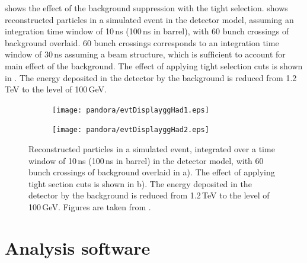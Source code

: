 
 shows the effect of the background suppression   with the tight \PFO selection.   shows reconstructed particles  in a simulated \HepProcess{\Pep\Pem \to \PHiggs\PHiggs \to \Ptop\APbottom\Pbottom\APtop} event  in the \CLICILD detector model, assuming an integration  time window of 10\,ns (100\,ns in \HCAL barrel), with 60 bunch crossings of \ggHad background overlaid. 60 bunch crossings corresponds to an integration time window of 30\,ns assuming a \CLIC beam structure, which is sufficient to account for main effect of the background.  The effect of applying tight \PFO selection cuts is shown in . The energy deposited in the detector by the background is reduced from 1.2\,TeV to the level of 100\,GeV.


\begin{figure}[tbph]
\centering
  \begin{subfigure}[b]{0.45\textwidth}
    \texttt{[image: pandora/evtDisplayggHad1.eps]}
    \caption{}
    \label{fig:pandoraEvtDisplayggHad1}
  \end{subfigure}
  \begin{subfigure}[b]{0.45\textwidth}
    \texttt{[image: pandora/evtDisplayggHad2.eps]}
    \caption{}
    \label{fig:pandoraEvtDisplayggHad2}
  \end{subfigure}
\caption[Effect of the suppression of the background with the tight \PFO selection.]
{Reconstructed particles  in a simulated \HepProcess{\Pep\Pem \to \PHiggs\PHiggs \to \Ptop\APbottom\Pbottom\APtop} event, integrated over a time window of 10\,ns (100\,ns in \HCAL barrel) in the \CLICILD detector model, with 60 bunch crossings of \ggHad background overlaid in a). The effect of applying tight \PFO section cuts is shown in b). The energy deposited in the detector by the background is reduced from 1.2\,TeV to the level of 100\,GeV. Figures are taken from \cite{Marshall:2012ry}.}
\label{fig:pandoraEvtDisplayggHad}
\end{figure}



\section{Analysis software}

